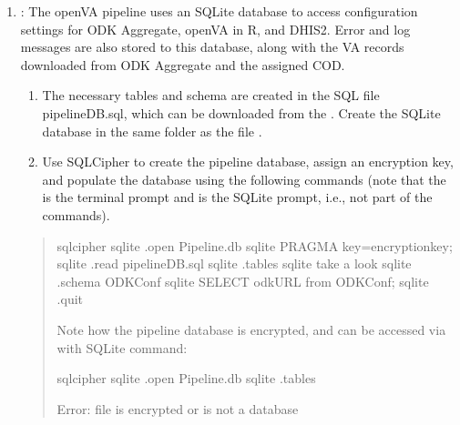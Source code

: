 \documentclass[letterpaper,12pt,english]{sphinxmanual}
\begin{document}
\label{\detokenize{config:pipeline-configuration}}\label{\detokenize{config::doc}}\begin{enumerate}
\item {} 
: The openVA pipeline uses an SQLite database to access configuration settings for ODK Aggregate, openVA in R,
and DHIS2. Error and log messages are also stored to this database, along with the VA records downloaded from ODK Aggregate and
the assigned COD.
\begin{enumerate}
\item {} 
The necessary tables and schema are created in the SQL file pipelineDB.sql, which can be downloaded from the
.  Create the SQLite database in the
same folder as the file .

\item {} 
Use SQLCipher to create the pipeline database, assign an encryption key, and populate the database using the following commands
(note that the \sphinxcode{\sphinxupquote{\$}} is the terminal prompt and  is the SQLite prompt, i.e., not part of the commands).

\end{enumerate}
\begin{quote}

%
\begin{sphinxVerbatim}[commandchars=\\\{\}]
\PYGZdl{} sqlcipher
sqlite\PYGZgt{} .open Pipeline.db
sqlite\PYGZgt{} PRAGMA key=encryption\PYGZus{}key;
sqlite\PYGZgt{} .read \PYGZdq{}pipelineDB.sql\PYGZdq{}
sqlite\PYGZgt{} .tables
sqlite\PYGZgt{} \PYGZhy{}\PYGZhy{} take a look \PYGZhy{}\PYGZhy{}
sqlite\PYGZgt{} .schema ODK\PYGZus{}Conf
sqlite\PYGZgt{} SELECT odkURL from ODK\PYGZus{}Conf;
sqlite\PYGZgt{} .quit
\end{sphinxVerbatim}

Note how the pipeline database is encrypted, and can be accessed via with SQLite command: 

%
\begin{sphinxVerbatim}[commandchars=\\\{\}]
\PYGZdl{} sqlcipher
sqlite\PYGZgt{} .open Pipeline.db
sqlite\PYGZgt{} .tables

Error: file is encrypted or is not a database


\end{sphinxVerbatim}
\end{quote}
\end{enumerate}
\end{document}
